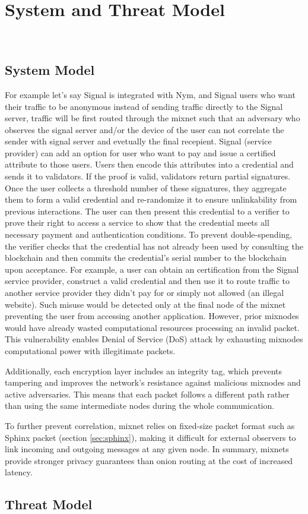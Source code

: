 \section{System and Threat Model}~\label{sec:sys_model}
\subsection{System Model}



For example let's say Signal is integrated with Nym, and Signal users who want their traffic to be anonymous instead of sending traffic directly to the Signal server, traffic will be first routed through the mixnet such that an adversary who observes the signal server and/or the device of the user can not correlate the sender with signal server and evetually the final recepient. Signal (service provider) can add an option for user who want to pay and issue a certified attribute to those users. Users then encode this attributes into a credential and sends it to validators. If the proof is valid, validators return partial signatures. Once the user collects a threshold number of these signatures, they aggregate them to form a valid credential and re-randomize it to ensure unlinkability from previous interactions. The user can then present this credential to a verifier to prove their right to access a service to show that the credential meets all necessary payment and authentication conditions. To prevent double-spending, the verifier checks that the credential has not already been used by consulting the blockchain and then commits the credential's serial number to the blockchain upon acceptance.
For example, a user can obtain an certification from the Signal service provider, construct a valid credential and then use it to route traffic to another service provider they didn't pay for or simply not allowed (an illegal website).
Such misuse would be detected only at the final node of the mixnet preventing the user from accessing another application. 
However, prior mixnodes would have already wasted computational resources processing an invalid packet. 
This vulnerability enables Denial of Service (DoS) attack by exhausting mixnodes computational power with illegitimate packets.

Additionally, each encryption layer includes an integrity tag, which prevents tampering and improves the network’s resistance against malicious mixnodes and active adversaries.
This means that each packet follows a different path rather than using the same intermediate nodes during the whole communication.
 
To further prevent correlation, mixnet relies on fixed-size packet format such as Sphinx packet (section \ref{sec:sphinx}), making it difficult for external observers to link incoming and outgoing messages at any given node.
In summary, mixnets provide stronger privacy guarantees than onion routing at the cost of increased latency.


\subsection{Threat Model}